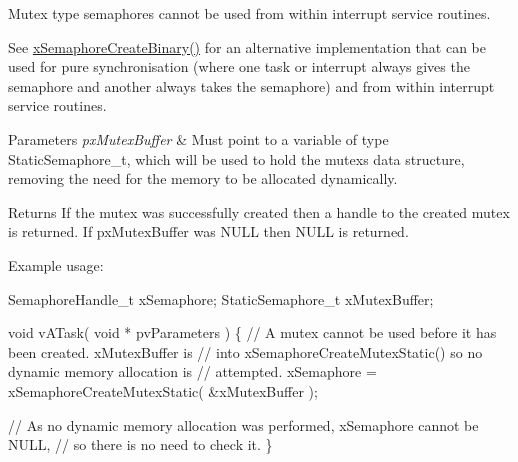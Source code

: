 Mutex type semaphores cannot be used from within interrupt service routines.

See \hyperlink{vendor_2ceedling_2plugins_2freertos_2src_2freertos_2include_2semphr_8h_acba963695e4f159d9bfa2394cae5badc}{x\+Semaphore\+Create\+Binary()} for an alternative implementation that can be used for pure synchronisation (where one task or interrupt always \textquotesingle{}gives\textquotesingle{} the semaphore and another always \textquotesingle{}takes\textquotesingle{} the semaphore) and from within interrupt service routines.


\begin{DoxyParams}{Parameters}
{\em px\+Mutex\+Buffer} & Must point to a variable of type Static\+Semaphore\+\_\+t, which will be used to hold the mutex\textquotesingle{}s data structure, removing the need for the memory to be allocated dynamically.\\
\hline
\end{DoxyParams}
\begin{DoxyReturn}{Returns}
If the mutex was successfully created then a handle to the created mutex is returned. If px\+Mutex\+Buffer was N\+U\+LL then N\+U\+LL is returned.
\end{DoxyReturn}
Example usage\+: 
\begin{DoxyPre}
SemaphoreHandle\_t xSemaphore;
StaticSemaphore\_t xMutexBuffer;\end{DoxyPre}



\begin{DoxyPre}void vATask( void * pvParameters )
\{
 // A mutex cannot be used before it has been created.  xMutexBuffer is
 // into xSemaphoreCreateMutexStatic() so no dynamic memory allocation is
 // attempted.
 xSemaphore = xSemaphoreCreateMutexStatic( &xMutexBuffer );\end{DoxyPre}



\begin{DoxyPre} // As no dynamic memory allocation was performed, xSemaphore cannot be NULL,
 // so there is no need to check it.
\}
\end{DoxyPre}
 